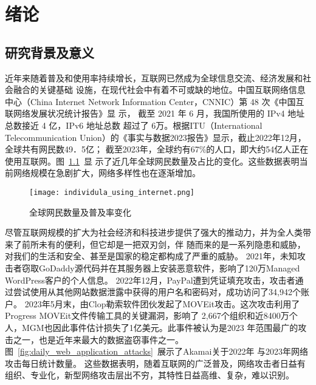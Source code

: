 \chapter{绪论}
\label{cha:overview}

\section{研究背景及意义}

近年来随着普及和使用率持续增长，互联网已然成为全球信息交流、经济发展和社会融合的关键基础
设施，在现代社会中有着不可或缺的地位。中国互联网络信息中心（China Internet 
Network Information Center，CNNIC）第 48 次《中国互联网络发展状况统计报告》显
示\cite{cnnic2021}， 截至 2021 年 6 月，我国所使用的 IPv4 地址总数接近 4 亿，IPv6 地址总数
超过了 6万。根据ITU（International Telecommunication Union）的《事实与数据2023报告》显示\cite{itu2023}，截止2022年12月，全球共有网民数49．5亿；
截至2023年，全球约有67\%的人口，即大约54亿人正在使用互联网。图~\ref{fig:individula_using_internet}~显
示了近几年全球网民数量及占比的变化。这些数据表明当前网络规模在急剧扩大，网络多样性也在逐渐增加。
\begin{figure}[htbp]
    \centering
    \texttt{[image: individula\_using\_internet.png]}
    \caption{全球网民数量及普及率变化\cite{fig-itu2023}}
    \label{fig:individula_using_internet}
\end{figure} 


尽管互联网规模的扩大为社会经济和科技进步提供了强大的推动力，并为全人类带来了前所未有的便利，但它却是一把双刃剑，伴
随而来的是一系列隐患和威胁，对我们的生活和安全、甚至是国家的稳定都构成了严重的威胁。
2021年，未知攻击者窃取GoDaddy源代码并在其服务器上安装恶意软件，影响了120万Managed WordPress客户的个人信息。
2022年12月，PayPal遭到凭证填充攻击，攻击者通过尝试使用从其他网站数据泄露中获得的用户名和密码对，成功访问了34,942个账户。
2023年5月末，由Clop勒索软件团伙发起了MOVEit攻击。这次攻击利用了Progress MOVEit文件传输工具的关键漏洞，影响了
2,667个组织和近8400万个人，MGM也因此事件估计损失了1亿美元​。此事件被认为是2023
年范围最广的攻击之一，也是近年来最大的数据盗窃事件之一。图~\ref{fig:daily_web_application_attacks}~展示了Akamai关于2022年
与2023年网络攻击每日统计数量。
这些数据表明，随着互联网的广泛普及，网络攻击者日益有组织、专业化，新型网络攻击层出不穷，其特性日益高维、复杂，难以识别。


